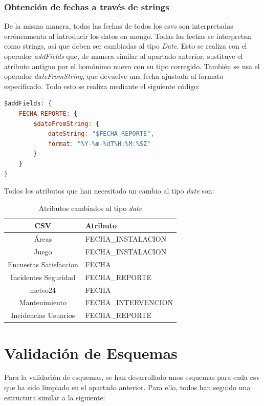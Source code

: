 \documentclass[]{article}
\begin{document}
\subsubsection{Obtención de fechas a través de strings}
De la misma manera, todas las fechas de todos los csvs son interpretadas erróneamenta al introducir los datos en mongo. Todas las fechas se interpretan como strings, así que deben ser cambiadas al tipo \textit{Date}. Esto se realiza con el operador \textit{addFields} que, de manera similar al apartado anterior, sustituye el atributo antiguo por el homónimo nuevo con su tipo corregido. También se usa el operador \textit{dateFromString}, que devuelve una fecha ajustada al formato especificado. Todo esto se realiza mediante el siguiente código:

\begin{lstlisting}[language=JavaScript, caption=Cambio a date de las fechas]
$addFields: {
    FECHA_REPORTE: {
        $dateFromString: {
            dateString: "$FECHA_REPORTE",
            format: "%Y-%m-%dT%H:%M:%SZ"
        }
    }
}
\end{lstlisting}

Todos los atributos que han necesitado un cambio al tipo \textit{date} son:

\begin{table}[H]
    \centering
    \begin{tabular}{| c | l | }
        \hline
        CSV & Atributo \\ \hline
        Áreas & FECHA\_INSTALACION \\
        Juego & FECHA\_INSTALACION \\ 
        Encuestas Satisfaccion & FECHA\\ 
        Incidentes Seguridad & FECHA\_REPORTE \\ 
        meteo24 & FECHA\\ 
        Mantenimiento & FECHA\_INTERVENCION\\ 
        Incidencias Usuarios & FECHA\_REPORTE\\ 
        \hline
    \end{tabular}
    \caption{Atributos cambiados al tipo \textit{date}}
\end{table}

\newpage
\section{Validación de Esquemas}
\label{sec:validacion}
Para la validación de esquemas, se han desarrollado unos esquemas para cada csv que ha sido limpiado en el apartado anterior. Para ello, todos han seguido una estructura similar a la siguiente:
\end{document}
